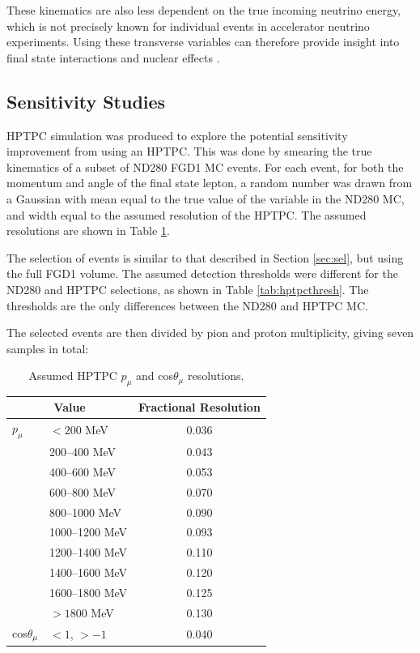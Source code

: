 These kinematics are also less dependent on the true incoming neutrino energy, which is not precisely known for individual events in accelerator neutrino experiments. Using these transverse variables can therefore provide insight into final state interactions and nuclear effects \cite{stv3}.

\subsection{Sensitivity Studies}

HPTPC simulation was produced to explore the potential sensitivity improvement from using an HPTPC. This was done by smearing the true kinematics of a subset of ND280 FGD1 MC events. For each event, for both the momentum and angle of the final state lepton, a random number was drawn from a Gaussian with mean equal to the true value of the variable in the ND280 MC, and width equal to the assumed resolution of the HPTPC. The assumed resolutions are shown in Table \ref{tab:hptpcres}.

The selection of events is similar to that described in Section \ref{sec:sel}, but using the full FGD1 volume. The assumed detection thresholds were different for the ND280 and HPTPC selections, as shown in Table \ref{tab:hptpcthresh}. The thresholds are the only differences between the ND280 and HPTPC MC.

The selected events are then divided by pion and proton multiplicity, giving seven samples in total:

\begin{center}
\begin{table}[!htbp]
\center
\begin{tabular}{l l||c}
\hline \hline
\multicolumn{2}{c||}{\textbf{Value}} & \textbf{Fractional Resolution}\\
\hline
\hline
$p_{\mu}$ & $<200$ MeV & 0.036 \\
 & 200--400 MeV & 0.043 \\
 & 400--600 MeV & 0.053 \\
 & 600--800 MeV & 0.070 \\
 & 800--1000 MeV & 0.090 \\
 & 1000--1200 MeV & 0.093 \\
 & 1200--1400 MeV & 0.110 \\
 & 1400--1600 MeV & 0.120 \\
 & 1600--1800 MeV & 0.125 \\
 & $>1800$ MeV & 0.130 \\  
\hline
cos$\theta_{\mu}$ & $<1$, $>-1$ & 0.040 \\
\hline \hline
\end{tabular}
\caption{Assumed HPTPC $p_{\mu}$ and cos$\theta_{\mu}$ resolutions.}
\label{tab:hptpcres}
\end{table}
\end{center}

